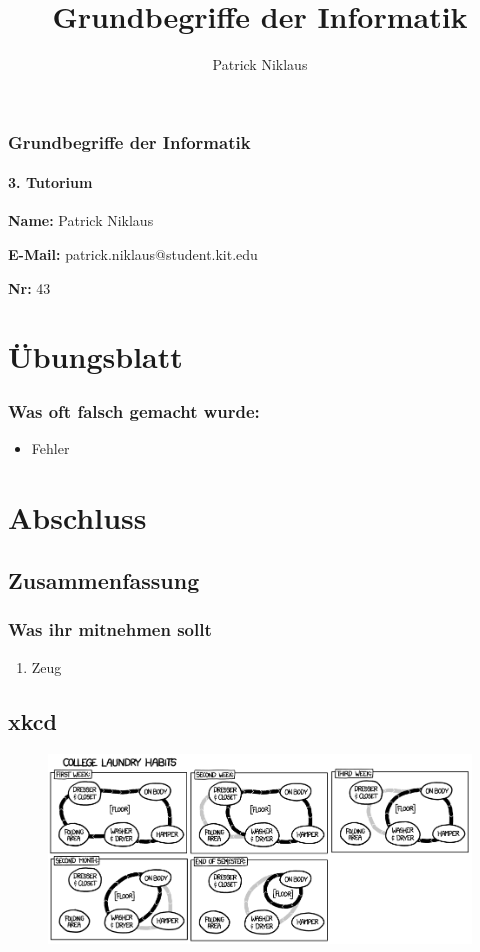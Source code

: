 \documentclass{beamer}
\title{Grundbegriffe der Informatik}
\author{Patrick Niklaus}
\begin{document}
\begin{frame}
  \frametitle{Grundbegriffe der Informatik}
  \framesubtitle{3. Tutorium}
  \begin{description}
    \item \textbf{Name:} Patrick Niklaus
    \item \textbf{E-Mail:} patrick.niklaus@student.kit.edu
    \item \textbf{Nr:} 43
  \end{description}
\end{frame}

\section{Übungsblatt}
\begin{frame}
  \frametitle{Was oft falsch gemacht wurde:}
  \begin{itemize}
    \item Fehler
  \end{itemize}
\end{frame}




\section{Abschluss}
\subsection{Zusammenfassung}
\begin{frame}
  \frametitle{Was ihr mitnehmen sollt}
  \begin{enumerate}
    \item Zeug
  \end{enumerate}
\end{frame}

\subsection{xkcd}
\begin{frame}[plain]
  \begin{figure}
    \begin{center}
      \includegraphics[width=320pt]{laundry}
    \end{center}
  \end{figure}
\end{frame}
\end{document}
